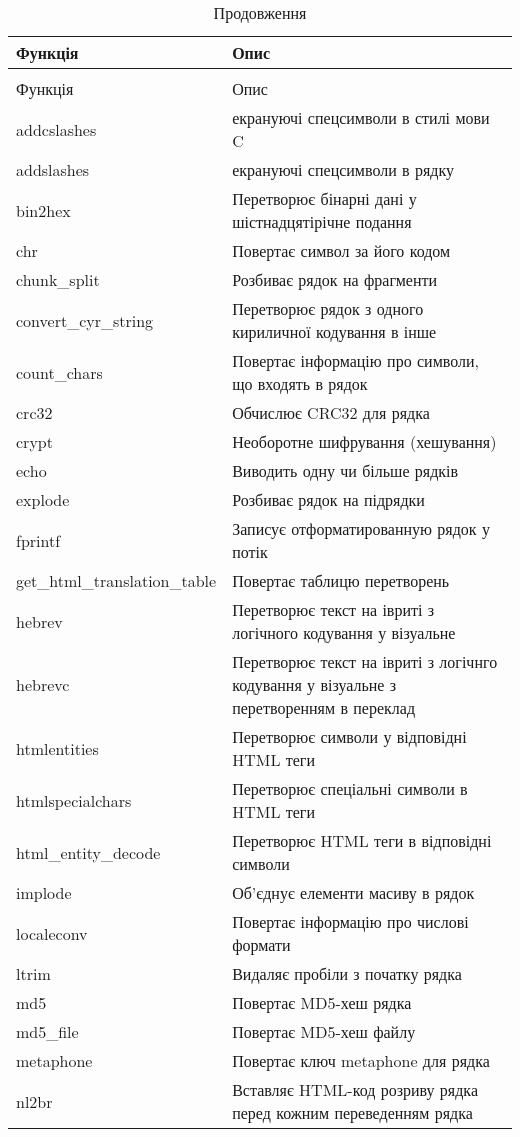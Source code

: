 \begin{longtable}[t]{|l|p{21em}|}
Функція & Опис \\
\hline \endfirsthead
\caption*{\space Продовження} \\
\hline
Функція & Опис \\
\hline \endhead
\hline \endfoot
addcslashes & екрануючі спецсимволи в стилі мови C \\
addslashes & екрануючі спецсимволи в рядку \\
bin2hex & Перетворює бінарні дані у шістнадцятірічне подання \\
chr & Повертає символ за його кодом \\
chunk\_split & Розбиває рядок на фрагменти \\
convert\_cyr\_string & Перетворює рядок з одного кириличної кодування в інше \\
count\_chars & Повертає інформацію про символи, що входять в рядок \\
crc32 & Обчислює CRC32 для рядка \\
crypt & Необоротне шифрування (хешування) \\
echo & Виводить одну чи більше рядків \\
explode & Розбиває рядок на підрядки \\
fprintf & Записує отформатированную рядок у потік \\
get\_html\_translation\_table & Повертає таблицю перетворень \\
hebrev & Перетворює текст на івриті з логічного кодування у візуальне \\
hebrevc & Перетворює текст на івриті з логічнго кодування у візуальне з перетворенням в переклад \\
htmlentities & Перетворює символи у відповідні HTML теги \\
htmlspecialchars & Перетворює спеціальні символи в HTML теги \\
html\_entity\_decode & Перетворює HTML теги в відповідні символи \\
implode & Об'єднує елементи масиву в рядок \\
localeconv & Повертає інформацію про числові формати \\
ltrim & Видаляє пробіли з початку рядка \\
md5 & Повертає MD5-хеш рядка \\
md5\_file & Повертає MD5-хеш файлу \\
metaphone & Повертає ключ metaphone для рядка \\
nl2br & Вставляє HTML-код розриву рядка перед кожним переведенням рядка \\

\end{longtable}
